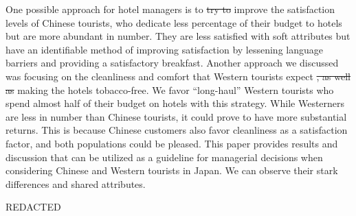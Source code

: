 \documentclass[smallextended,natbib]{svjour3}       %
\providecommand{\DIFadd}[1]{{\protect\color{blue}\uwave{#1}}} %
\providecommand{\DIFdel}[1]{{\protect\color{red}\sout{#1}}}                      %
\providecommand{\DIFaddbegin}{} %
\providecommand{\DIFaddend}{} %
\providecommand{\DIFdelbegin}{} %
\providecommand{\DIFdelend}{} %
\newcommand{\DIFscaledelfig}{0.5}
\newlength{\DIFdelgraphicswidth} %
\newlength{\DIFdelgraphicsheight} %
\newcommand{\DIFaddincludegraphics}[2][]{{\color{blue}\fbox{\DIFOincludegraphics[#1]{#2}}}} %
\newcommand{\DIFdelincludegraphics}[2][]{%
\sbox{\DIFdelgraphicsbox}{\DIFOincludegraphics[#1]{#2}}%
\settoboxwidth{\DIFdelgraphicswidth}{\DIFdelgraphicsbox} %
\settoboxtotalheight{\DIFdelgraphicsheight}{\DIFdelgraphicsbox} %
\scalebox{\DIFscaledelfig}{%
\parbox[b]{\DIFdelgraphicswidth}{\usebox{\DIFdelgraphicsbox}\\[-\baselineskip] \rule{\DIFdelgraphicswidth}{0em}}\llap{\resizebox{\DIFdelgraphicswidth}{\DIFdelgraphicsheight}{%
\setlength{\unitlength}{\DIFdelgraphicswidth}%
\begin{picture}(1,1)%
\thicklines\linethickness{2pt} %
{\color[rgb]{1,0,0}\put(0,0){\framebox(1,1){}}}%
{\color[rgb]{1,0,0}\put(0,0){\line( 1,1){1}}}%
{\color[rgb]{1,0,0}\put(0,1){\line(1,-1){1}}}%
\end{picture}%
}\hspace*{3pt}}} %
} %
\DeclareRobustCommand{\DIFaddbegin}{\DIFOaddbegin \let\includegraphics\DIFaddincludegraphics} %
\DeclareRobustCommand{\DIFaddend}{\DIFOaddend \let\includegraphics\DIFOincludegraphics} %
\DeclareRobustCommand{\DIFdelbegin}{\DIFOdelbegin \let\includegraphics\DIFdelincludegraphics} %
\DeclareRobustCommand{\DIFdelend}{\DIFOaddend \let\includegraphics\DIFOincludegraphics} %
\begin{document}
  One possible approach for hotel managers is to \DIFdelbegin \DIFdel{try to }\DIFdelend improve the satisfaction levels of Chinese tourists, who dedicate less percentage of their budget to hotels but are more abundant in number. They are less satisfied with soft attributes but have an identifiable method of improving satisfaction by lessening language barriers and providing a satisfactory breakfast. Another approach we discussed was focusing on the cleanliness and comfort that Western tourists expect \DIFdelbegin \DIFdel{, as well as }\DIFdelend \DIFaddbegin \DIFadd{and }\DIFaddend making the hotels tobacco-free. We favor ``long-haul'' Western tourists who spend almost half of their budget on hotels with this strategy. While Westerners are less in number than Chinese tourists, it could prove to have more substantial returns. This is because Chinese customers also favor cleanliness as a satisfaction factor, and both populations could be pleased. This paper provides results and discussion that can be utilized as a guideline for managerial decisions when considering Chinese and Western tourists in Japan. We can observe their stark differences and shared attributes. 

\begin{acknowledgements}

  REDACTED

\end{acknowledgements}



\end{document}
